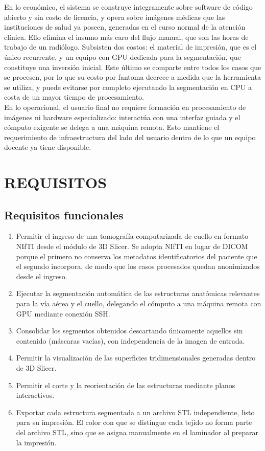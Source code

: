 En lo económico, el sistema se construye íntegramente sobre software de código abierto y sin costo de licencia, y opera sobre imágenes médicas que las instituciones de salud ya poseen, generadas en el curso normal de la atención clínica. Ello elimina el insumo más caro del flujo manual, que son las horas de trabajo de un radiólogo. Subsisten dos costos: el material de impresión, que es el único recurrente, y un equipo con GPU dedicada para la segmentación, que constituye una inversión inicial. Este último se comparte entre todos los casos que se procesen, por lo que su costo por fantoma decrece a medida que la herramienta se utiliza, y puede evitarse por completo ejecutando la segmentación en CPU a costa de un mayor tiempo de procesamiento.\\

En lo operacional, el usuario final no requiere formación en procesamiento de imágenes ni hardware especializado: interactúa con una interfaz guiada y el cómputo exigente se delega a una máquina remota. Esto mantiene el requerimiento de infraestructura del lado del usuario dentro de lo que un equipo docente ya tiene disponible.\\

\section{REQUISITOS}

\subsection{Requisitos funcionales}

\begin{enumerate}
  \item Permitir el ingreso de una tomografía computarizada de cuello en formato NIfTI desde el módulo de 3D Slicer. Se adopta NIfTI en lugar de DICOM porque el primero no conserva los metadatos identificatorios del paciente que el segundo incorpora, de modo que los casos procesados quedan anonimizados desde el ingreso.
  \item Ejecutar la segmentación automática de las estructuras anatómicas relevantes para la vía aérea y el cuello, delegando el cómputo a una máquina remota con GPU mediante conexión SSH.
  \item Consolidar los segmentos obtenidos descartando únicamente aquellos sin contenido (máscaras vacías), con independencia de la imagen de entrada.
  \item Permitir la visualización de las superficies tridimensionales generadas dentro de 3D Slicer.
  \item Permitir el corte y la reorientación de las estructuras mediante planos interactivos.
  \item Exportar cada estructura segmentada a un archivo STL independiente, listo para su impresión. El color con que se distingue cada tejido no forma parte del archivo STL, sino que se asigna manualmente en el laminador al preparar la impresión.
\end{enumerate}

